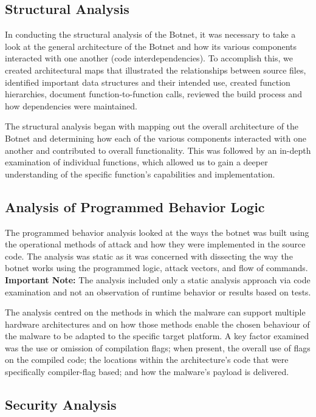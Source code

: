 \documentclass[12pt,letterpaper]{report}
\begin{document}
\subsection{Structural Analysis}

In conducting the structural analysis of the Botnet, it was necessary to take a look at the general architecture of the Botnet and how its various components interacted with one another (code interdependencies). To accomplish this, we created architectural maps that illustrated the relationships between source files, identified important data structures and their intended use, created function hierarchies, document function-to-function calls, reviewed the build process and how dependencies were maintained.

The structural analysis began with mapping out the overall architecture of the Botnet and determining how each of the various components interacted with one another and contributed to overall functionality. This was followed by an in-depth examination of individual functions, which allowed us to gain a deeper understanding of the specific function's capabilities and implementation.


\subsection{Analysis of Programmed Behavior Logic}

The programmed behavior analysis looked at the ways the botnet was built using the operational methods of attack and how they were implemented in the source code. The analysis was static as it was concerned with dissecting the way the botnet works using the programmed logic, attack vectors, and flow of commands. \textbf{Important Note:} The analysis included only a static analysis approach via code examination and not an observation of runtime behavior or results based on tests.

The analysis centred on the methods in which the malware can support multiple hardware architectures and on how those methods enable the chosen behaviour of the malware to be adapted to the specific target platform. A key factor examined was the use or omission of compilation flags; when present, the overall use of flags on the compiled code; the locations within the architecture's code that were specifically compiler-flag based; and how the malware's payload is delivered.

\subsection{Security Analysis}
\end{document}
